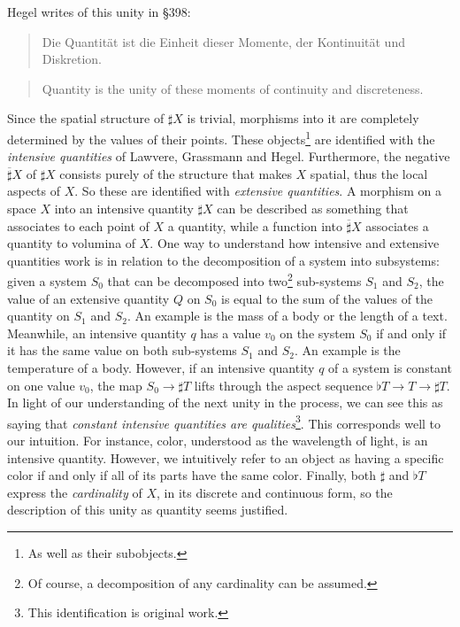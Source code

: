 \documentclass{article}
\begin{document}
Hegel writes of this unity in §398:

\begin{quote}
    Die Quantität ist die Einheit dieser Momente, der Kontinuität und Diskretion.
\end{quote}

\begin{quote}
    Quantity is the unity of these moments of continuity and discreteness.
\end{quote}

Since the spatial structure of $\sharp X$ is trivial, morphisms into it are completely determined by the values of their points. These objects\footnote{As well as their subobjects.} are identified with the \emph{intensive quantities} of Lawvere\cite{Law82}, Grassmann\cite{Grass} and Hegel. Furthermore, the negative $\overline{\sharp} X$ of $\sharp X$ consists purely of the structure that makes $X$ spatial, thus the local aspects of $X$. So these are identified with \emph{extensive quantities}. A morphism on a space $X$ into an intensive quantity $\sharp X$ can be described as something that associates to each point of $X$ a quantity, while a function into $\overline{\sharp} X$ associates a quantity to volumina of $X$. One way to understand how intensive and extensive quantities work is in relation to the decomposition of a system into subsystems\cite{nlabie}: given a system $S_0$ that can be decomposed into two\footnote{Of course, a decomposition of any cardinality can be assumed.} sub-systems $S_1$ and $S_2$, the value of an extensive quantity $Q$ on $S_0$ is equal to the sum of the values of the quantity on $S_1$ and $S_2$. An example is the mass of a body or the length of a text. Meanwhile, an intensive quantity $q$ has a value $v_0$ on the system $S_0$ if and only if it has the same value on both sub-systems $S_1$ and $S_2$. An example is the temperature of a body. However, if an intensive quantity $q$ of a system is constant on one value $v_0$, the map $S_0\rightarrow\sharp T$ lifts through the aspect sequence $\flat T\rightarrow T\rightarrow\sharp T$. In light of our understanding of the next unity in the process, we can see this as saying that \emph{constant intensive quantities are qualities}\footnote{This identification is original work.}. This corresponds well to our intuition. For instance, color, understood as the wavelength of light, is an intensive quantity. However, we intuitively refer to an object as having a specific color if and only if all of its parts have the same color. Finally, both $\sharp$ and $\flat T$ express the \emph{cardinality} of $X$, in its discrete and continuous form, so the description of this unity as quantity seems justified. \\
\end{document}

